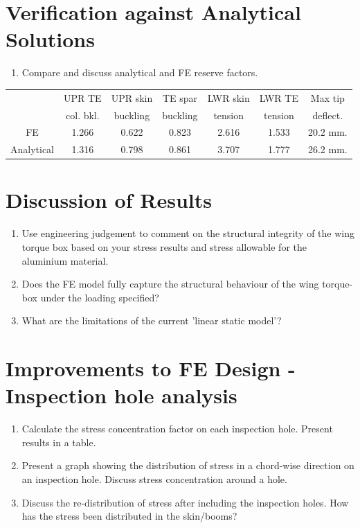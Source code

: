 \documentclass[11pt,a4paper,oneside]{memoir}
\begin{document}
\section{Verification against Analytical Solutions}
\begin{enumerate}
	\item Compare and discuss analytical and FE reserve factors.
\end{enumerate}

\begin{center}
	\begin{tabular}{ccccccc}
		\toprule
		            & UPR TE   & UPR skin & TE spar  & LWR skin & LWR TE  & Max tip  \\
		            & col. bkl.& buckling & buckling & tension  & tension & deflect. \\
		\midrule
		FE          &  1.266  &  0.622  &  0.823  &  2.616 & 1.533  &  20.2 mm.   \\
		\midrule
		Analytical  &  1.316  &  0.798  &  0.861  &  3.707  & 1.777  &  26.2 mm.   \\
		\bottomrule
	\end{tabular}
\end{center}

\section{Discussion of Results}
\begin{enumerate}
	\item Use engineering judgement to comment on the structural integrity of the wing torque box based on your stress results and stress allowable for the aluminium material. 
	\item Does the FE model fully capture the structural behaviour of the wing torque-box under the loading specified?
	\item What are the limitations of the current 'linear static model'?
\end{enumerate}	

\section{Improvements to FE Design - Inspection hole analysis}
\begin{enumerate}
	\item Calculate the stress concentration factor on each inspection hole. Present results in a table.
	\item Present a graph showing the distribution of stress in a chord-wise direction on an inspection hole. Discuss stress concentration around a hole.
	\item Discuss the re-distribution of stress after including the inspection holes. How has the stress been distributed in the skin/booms?
\end{enumerate}
\end{document}
